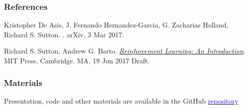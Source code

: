 \documentclass{beamer}
\begin{document}
\begin{frame}
  \frametitle<presentation>{References}

  \begin{thebibliography}{10}

  \beamertemplatebookbibitems

  \beamertemplatearticlebibitems

    Kristopher De Asis, J. Fernando Hernandez-Garcia, G. Zacharias Holland,
    Richard S. Sutton.
    .
    \newblock arXiv, 3 Mar 2017.

   Richard S. Sutton, Andrew G. Barto.
    \newblock
    {\href{http://incompleteideas.net/sutton/book/the-book-2nd.html}{\em
      Reinforcement Learning: An Introduction}}.
    \newblock MIT Press, Cambridge, MA, 19 Jun 2017 Draft.

  \end{thebibliography}
\end{frame}


\begin{frame}
  \frametitle{Materials}
  \begin{center}
  Presentation, code and other materials are available in the GitHub
  \href{https://github.com/omtcyfz/talks/tree/master/n-step-q-sigma}{
    \textcolor{blue}{repository}}
  \end{center}
\end{frame}

\end{document}
